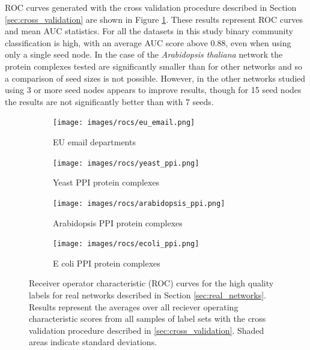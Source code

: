 \documentclass[sigconf]{acmart}
\begin{document}
ROC curves generated with the cross validation procedure described in Section \ref{sec:cross_validation} are shown in Figure \ref{fig:quality_label_rocs}.
These results represent ROC curves and mean AUC statistics.
For all the datasets in this study binary community classification is high, with an average AUC score above 0.88, even when using only a single seed node.
In the case of the \textit{Arabidopsis thaliana} network the protein complexes tested are significantly smaller than for other networks and so a comparison of seed sizes is not possible.
However, in the other networks studied using 3 or more seed nodes appears to improve results, though for 15 seed nodes the results are not significantly better than with 7 seeds.



\begin{figure}
     \centering
    \begin{subfigure}[b]{0.48\textwidth}
        \centering
        \texttt{[image: images/rocs/eu\_email.png]}
        \caption{EU email departments}
    \end{subfigure}
    \begin{subfigure}[b]{0.48\textwidth}
        \centering
        \texttt{[image: images/rocs/yeast\_ppi.png]}
        \caption{Yeast PPI protein complexes}
    \end{subfigure}
    
    \begin{subfigure}[b]{0.48\textwidth}
        \centering
        \texttt{[image: images/rocs/arabidopsis\_ppi.png]}
        \caption{Arabidopsis PPI protein complexes}
    \end{subfigure}
    \begin{subfigure}[b]{0.48\textwidth}
        \centering
        \texttt{[image: images/rocs/ecoli\_ppi.png]}
        \caption{E coli PPI protein complexes}
    \end{subfigure}
    \caption{Receiver operator characteristic (ROC) curves for the high quality labels for real networks described in Section \ref{sec:real_networks}. 
    Results represent the averages over all reciever operating characteristic scores from all samples of label sets with the cross validation procedure described in \ref{sec:cross_validation}.
    Shaded areas indicate standard deviations.}
    \label{fig:quality_label_rocs}
\end{figure}
\end{document}

